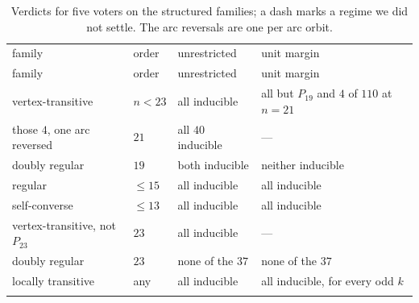 \documentclass[
]{article}
\newcounter{none} %
\begin{document}
\begin{longtable}[]{@{}
  >{\raggedright\arraybackslash}p{}
  >{\raggedright\arraybackslash}p{}
  >{\raggedright\arraybackslash}p{}
  >{\raggedright\arraybackslash}p{}@{}}
\caption{Verdicts for five voters on the structured families; a dash
marks a regime we did not settle. The arc reversals are one per arc
orbit.}\tabularnewline*
\toprule\noalign{}
\begin{minipage}[b]{\linewidth}\raggedright
family
\end{minipage} & \begin{minipage}[b]{\linewidth}\raggedright
order
\end{minipage} & \begin{minipage}[b]{\linewidth}\raggedright
unrestricted
\end{minipage} & \begin{minipage}[b]{\linewidth}\raggedright
unit margin
\end{minipage} \\*
\midrule\noalign{}
\endfirsthead
\toprule\noalign{}
\begin{minipage}[b]{\linewidth}\raggedright
family
\end{minipage} & \begin{minipage}[b]{\linewidth}\raggedright
order
\end{minipage} & \begin{minipage}[b]{\linewidth}\raggedright
unrestricted
\end{minipage} & \begin{minipage}[b]{\linewidth}\raggedright
unit margin
\end{minipage} \\*
\midrule\noalign{}
\endhead
\bottomrule\noalign{}
\endlastfoot
vertex-transitive & \(n < 23\) & all inducible & all but \(P_{19}\) and
\(4\) of \(110\) at \(n = 21\) \\*
those \(4\), one arc reversed & \(21\) & all \(40\) inducible & --- \\*
doubly regular & \(19\) & both inducible & neither inducible \\*
regular & \(\le 15\) & all inducible & all inducible \\*
self-converse & \(\le 13\) & all inducible & all inducible \\*
vertex-transitive, not \(P_{23}\) & \(23\) & all inducible & --- \\*
doubly regular & \(23\) & none of the \(37\) & none of the \(37\) \\*
locally transitive & any & all inducible & all inducible, for every odd
\(k\) \\*
\end{longtable}
\end{document}
